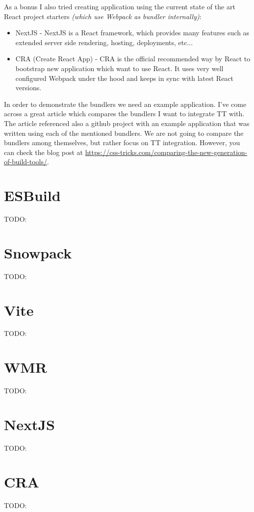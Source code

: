 As a bonus I also tried creating application using the current state of the art React project
starters \emph{(which use Webpack as bundler internally)}:

\begin{itemize}
  \item  NextJS \cite{nextjs_web} - NextJS is a React framework, which provides many features such
        as extended server side rendering, hosting, deployments, etc...
  \item  CRA (Create React App) \cite{cra_web} - CRA is the official recommended way by React to
        bootstrap new application which want to use React. It uses very well configured Webpack
        under the hood and keeps in sync with latest React versions.
\end{itemize}

\bigskip

In order to demonstrate the bundlers we need an example application. I've come across a great
article which compares the bundlers I want to integrate TT with. The article referenced also a
github project with an example application that was written using each of the mentioned bundlers. We
are not going to compare the bundlers among themselves, but rather focus on TT integration. However,
you can check the blog post at
\url{https://css-tricks.com/comparing-the-new-generation-of-build-tools/}.

\section{ESBuild}

TODO:

\section{Snowpack}

TODO:

\section{Vite}

TODO:

\section{WMR}

TODO:

\section{NextJS}

TODO:

\section{CRA}

TODO:

